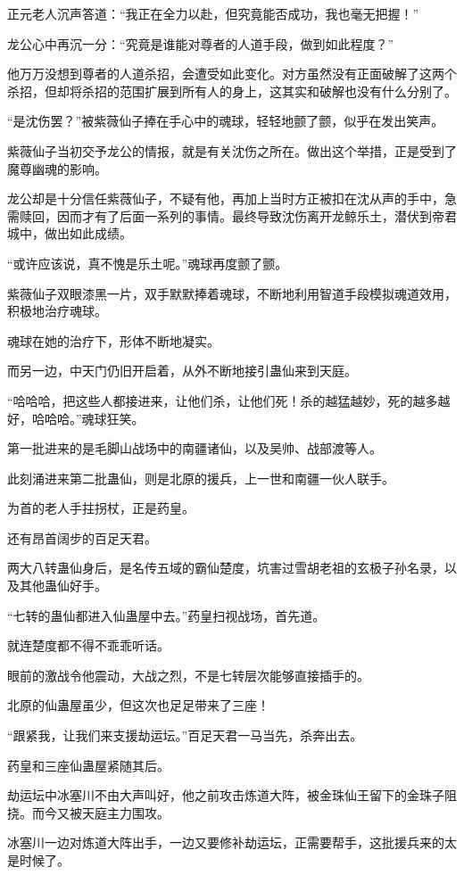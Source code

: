 \begin{this_body}
正元老人沉声答道：“我正在全力以赴，但究竟能否成功，我也毫无把握！”

龙公心中再沉一分：“究竟是谁能对尊者的人道手段，做到如此程度？”

他万万没想到尊者的人道杀招，会遭受如此变化。对方虽然没有正面破解了这两个杀招，但却将杀招的范围扩展到所有人的身上，这其实和破解也没有什么分别了。

“是沈伤罢？”被紫薇仙子捧在手心中的魂球，轻轻地颤了颤，似乎在发出笑声。

紫薇仙子当初交予龙公的情报，就是有关沈伤之所在。做出这个举措，正是受到了魔尊幽魂的影响。

龙公却是十分信任紫薇仙子，不疑有他，再加上当时方正被扣在沈从声的手中，急需赎回，因而才有了后面一系列的事情。最终导致沈伤离开龙鲸乐土，潜伏到帝君城中，做出如此成绩。

“或许应该说，真不愧是乐土呢。”魂球再度颤了颤。

紫薇仙子双眼漆黑一片，双手默默捧着魂球，不断地利用智道手段模拟魂道效用，积极地治疗魂球。

魂球在她的治疗下，形体不断地凝实。

而另一边，中天门仍旧开启着，从外不断地接引蛊仙来到天庭。

“哈哈哈，把这些人都接进来，让他们杀，让他们死！杀的越猛越妙，死的越多越好，哈哈哈。”魂球狂笑。

第一批进来的是毛脚山战场中的南疆诸仙，以及吴帅、战部渡等人。

此刻涌进来第二批蛊仙，则是北原的援兵，上一世和南疆一伙人联手。

为首的老人手拄拐杖，正是药皇。

还有昂首阔步的百足天君。

两大八转蛊仙身后，是名传五域的霸仙楚度，坑害过雪胡老祖的玄极子孙名录，以及其他蛊仙好手。

“七转的蛊仙都进入仙蛊屋中去。”药皇扫视战场，首先道。

就连楚度都不得不乖乖听话。

眼前的激战令他震动，大战之烈，不是七转层次能够直接插手的。

北原的仙蛊屋虽少，但这次也足足带来了三座！

“跟紧我，让我们来支援劫运坛。”百足天君一马当先，杀奔出去。

药皇和三座仙蛊屋紧随其后。

劫运坛中冰塞川不由大声叫好，他之前攻击炼道大阵，被金珠仙王留下的金珠子阻挠。而今又被天庭主力围攻。

冰塞川一边对炼道大阵出手，一边又要修补劫运坛，正需要帮手，这批援兵来的太是时候了。


\end{this_body}
